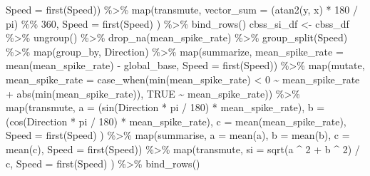 \documentclass[
]{book}
\newenvironment{Shaded}{\begin{snugshade}}{\end{snugshade}}
\newcommand{\AttributeTok}[1]{\textcolor[rgb]{0.77,0.63,0.00}{#1}}
\newcommand{\ConstantTok}[1]{\textcolor[rgb]{0.00,0.00,0.00}{#1}}
\newcommand{\DecValTok}[1]{\textcolor[rgb]{0.00,0.00,0.81}{#1}}
\newcommand{\FunctionTok}[1]{\textcolor[rgb]{0.00,0.00,0.00}{#1}}
\newcommand{\NormalTok}[1]{#1}
\newcommand{\OtherTok}[1]{\textcolor[rgb]{0.56,0.35,0.01}{#1}}
\newcommand{\SpecialCharTok}[1]{\textcolor[rgb]{0.00,0.00,0.00}{#1}}
\begin{document}
\begin{Shaded}
\begin{Highlighting}[]
      \AttributeTok{Speed =} \FunctionTok{first}\NormalTok{(Speed)) }\SpecialCharTok{\%\textgreater{}\%}
  \FunctionTok{map}\NormalTok{(transmute,}
      \AttributeTok{vector\_sum =}\NormalTok{ (}\FunctionTok{atan2}\NormalTok{(y, x) }\SpecialCharTok{*} \DecValTok{180} \SpecialCharTok{/}\NormalTok{ pi) }\SpecialCharTok{\%\%} \DecValTok{360}\NormalTok{,}
      \AttributeTok{Speed =} \FunctionTok{first}\NormalTok{(Speed)}
\NormalTok{  ) }\SpecialCharTok{\%\textgreater{}\%}
  \FunctionTok{bind\_rows}\NormalTok{()}
\NormalTok{cbss\_si\_df }\OtherTok{\textless{}{-}}
\NormalTok{  cbss\_df }\SpecialCharTok{\%\textgreater{}\%}
  \FunctionTok{ungroup}\NormalTok{() }\SpecialCharTok{\%\textgreater{}\%}
  \FunctionTok{drop\_na}\NormalTok{(mean\_spike\_rate) }\SpecialCharTok{\%\textgreater{}\%}
  \FunctionTok{group\_split}\NormalTok{(Speed) }\SpecialCharTok{\%\textgreater{}\%}
  \FunctionTok{map}\NormalTok{(group\_by, Direction) }\SpecialCharTok{\%\textgreater{}\%}
  \FunctionTok{map}\NormalTok{(summarize,}
      \AttributeTok{mean\_spike\_rate =} \FunctionTok{mean}\NormalTok{(mean\_spike\_rate) }\SpecialCharTok{{-}}\NormalTok{ global\_base,}
      \AttributeTok{Speed =} \FunctionTok{first}\NormalTok{(Speed)) }\SpecialCharTok{\%\textgreater{}\%}
  \FunctionTok{map}\NormalTok{(mutate,}
      \AttributeTok{mean\_spike\_rate =}
        \FunctionTok{case\_when}\NormalTok{(}\FunctionTok{min}\NormalTok{(mean\_spike\_rate) }\SpecialCharTok{\textless{}} \DecValTok{0} \SpecialCharTok{\textasciitilde{}}\NormalTok{ mean\_spike\_rate }\SpecialCharTok{+} \FunctionTok{abs}\NormalTok{(}\FunctionTok{min}\NormalTok{(mean\_spike\_rate)),}
                  \ConstantTok{TRUE} \SpecialCharTok{\textasciitilde{}}\NormalTok{ mean\_spike\_rate)) }\SpecialCharTok{\%\textgreater{}\%}
  \FunctionTok{map}\NormalTok{(transmute,}
      \AttributeTok{a =}\NormalTok{ (}\FunctionTok{sin}\NormalTok{(Direction }\SpecialCharTok{*}\NormalTok{ pi }\SpecialCharTok{/} \DecValTok{180}\NormalTok{) }\SpecialCharTok{*}\NormalTok{ mean\_spike\_rate),}
      \AttributeTok{b =}\NormalTok{ (}\FunctionTok{cos}\NormalTok{(Direction }\SpecialCharTok{*}\NormalTok{ pi }\SpecialCharTok{/} \DecValTok{180}\NormalTok{) }\SpecialCharTok{*}\NormalTok{ mean\_spike\_rate),}
      \AttributeTok{c =} \FunctionTok{mean}\NormalTok{(mean\_spike\_rate),}
      \AttributeTok{Speed =} \FunctionTok{first}\NormalTok{(Speed)}
\NormalTok{  ) }\SpecialCharTok{\%\textgreater{}\%}
  \FunctionTok{map}\NormalTok{(summarise,}
      \AttributeTok{a =} \FunctionTok{mean}\NormalTok{(a),}
      \AttributeTok{b =} \FunctionTok{mean}\NormalTok{(b),}
      \AttributeTok{c =} \FunctionTok{mean}\NormalTok{(c),}
      \AttributeTok{Speed =} \FunctionTok{first}\NormalTok{(Speed)) }\SpecialCharTok{\%\textgreater{}\%}
  \FunctionTok{map}\NormalTok{(transmute,}
      \AttributeTok{si =} \FunctionTok{sqrt}\NormalTok{(a }\SpecialCharTok{\^{}} \DecValTok{2} \SpecialCharTok{+}\NormalTok{ b }\SpecialCharTok{\^{}} \DecValTok{2}\NormalTok{) }\SpecialCharTok{/}\NormalTok{ c,}
      \AttributeTok{Speed =} \FunctionTok{first}\NormalTok{(Speed)}
\NormalTok{  ) }\SpecialCharTok{\%\textgreater{}\%}
  \FunctionTok{bind\_rows}\NormalTok{()}


\end{Highlighting}
\end{Shaded}
\end{document}
